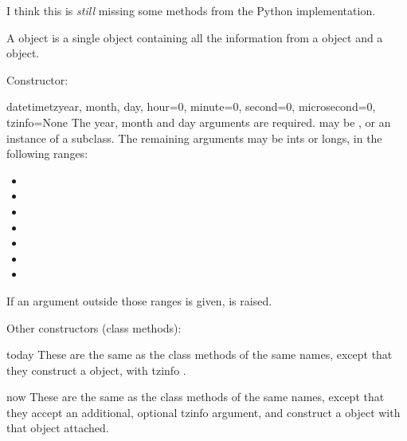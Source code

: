 \begin{notice}[warning]
  I think this is \emph{still} missing some methods from the
  Python implementation.
\end{notice}

A  object is a single object containing all the information
from a  object and a  object.

Constructor:

\begin{classdesc}{datetimetz}{year, month, day,
                              hour=0, minute=0, second=0, microsecond=0,
                              tzinfo=None}
  The year, month and day arguments are required.   may
  be , or an instance of a  subclass.  The
  remaining arguments may be ints or longs, in the following ranges:

  \begin{itemize}
    \item {}
    \item {}
    \item {}
    \item {}
    \item {}
    \item {}
    \item {}
  \end{itemize}

  If an argument outside those ranges is given,
   is raised.
\end{classdesc}

Other constructors (class methods):

\begin{funcdesc}{today}{}
  These are the same as the  class methods of the
  same names, except that they construct a 
  object, with tzinfo .
\end{funcdesc}

\begin{funcdesc}{now}{}
  These are the same as the  class methods of the
  same names, except that they accept an additional, optional tzinfo
  argument, and construct a  object with that
   object attached.
\end{funcdesc}

